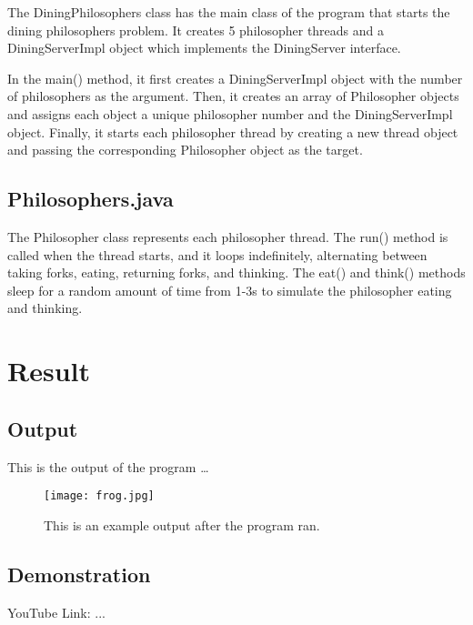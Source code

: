 \documentclass{article}
\begin{document}
The DiningPhilosophers class has the main class of the program that starts the dining philosophers problem. It creates 5 philosopher threads and a DiningServerImpl object which implements the DiningServer interface.

In the main() method, it first creates a DiningServerImpl object with the number of philosophers as the argument. Then, it creates an array of Philosopher objects and assigns each object a unique philosopher number and the DiningServerImpl object. Finally, it starts each philosopher thread by creating a new thread object and passing the corresponding Philosopher object as the target.

\subsection{Philosophers.java}

The Philosopher class represents each philosopher thread. The run() method is called when the thread starts, and it loops indefinitely, alternating between taking forks, eating, returning forks, and thinking. The eat() and think() methods sleep for a random amount of time from 1-3s to simulate the philosopher eating and thinking.

\section{Result}

\subsection{Output}
This is the output of the program \dots


\begin{figure}
\centering
\texttt{[image: frog.jpg]}
\caption{\label{fig:frog}This is an example output after the program ran.}
\end{figure}
    
\subsection{Demonstration}

YouTube Link: ...
\end{document}
